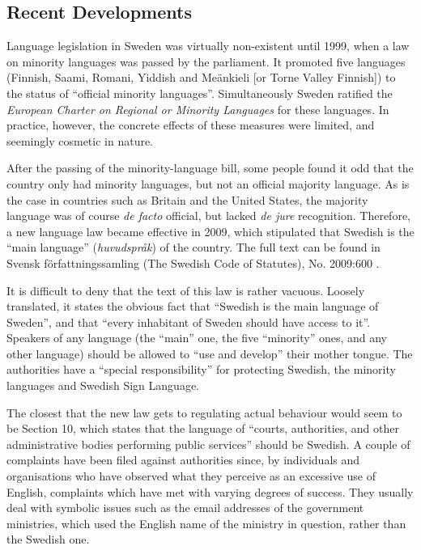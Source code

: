 \begin{multicols}{2}
\subsection{Recent Developments}

Language legislation in Sweden was virtually non-existent until 1999,
when a law on minority languages was passed by the parliament. It
promoted five languages (Finnish, Saami, Romani, Yiddish and Meänkieli
[or Torne Valley Finnish]) to the status of ``official minority
languages''. Simultaneously Sweden ratified the \emph{European
  Charter on Regional or Minority Languages} for these languages. In
practice, however, the concrete effects of these measures were
limited, and seemingly cosmetic in nature.

After the passing of the minority-language bill, some people found it
odd that the country only had minority languages, but not an official
majority language. As is the case in countries such as Britain and the
United States, the majority language was of course \emph{de facto}
official, but lacked \emph{de jure} recognition. Therefore, a new
language law became effective in 2009, which stipulated that Swedish
is the ``main language'' (\emph{huvudspråk}) of the
country. The full text can be found in Svensk författningssamling 
(The Swedish Code of Statutes), No. 2009:600 \cite{spraklag1}.

It is difficult to deny that the text of this law is rather
vacuous. Loosely translated, it states the obvious fact that ``Swedish
is the main language of Sweden'', and that ``every inhabitant of Sweden
should have access to it''. Speakers of any language (the ``main'' one,
the five ``minority'' ones, and any other language) should be allowed to
``use and develop'' their mother tongue. The authorities have a ``special
responsibility'' for protecting Swedish, the minority languages and
Swedish Sign Language.

The closest that the new law gets to regulating actual behaviour would
seem to be Section 10, which states that the language of ``courts,
authorities, and other administrative bodies performing public
services'' should be Swedish. A couple of complaints have been filed
against authorities since, by individuals and organisations who have
observed what they perceive as an excessive use of English, complaints
which have met with varying degrees of success. They usually deal with
symbolic issues such as the email addresses of the government
ministries, which used the English name of the ministry in question,
rather than the Swedish one.


\end{multicols}
